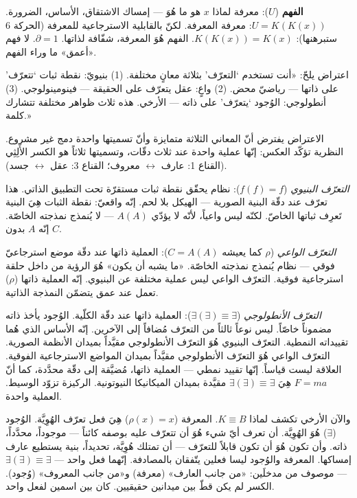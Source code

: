 \documentclass[10pt, openany, oneside]{book}
\begin{document}
\textbf{الفهم} ($U$): معرفة لماذا $x$ هو ما هُوَ --- إمساك الاشتقاق، الأساس، الضرورة. $U = K(K(x))$: معرفة المعرفة. لكنّ بالقابلية الاسترجاعية للمعرفة (الحركة 6 ستبرهنها): $K(K(x)) = K(x)$. الفهم هُوَ المعرفة، شفّافة لذاتها. $\partial = 1$. لا فهم «أعمق» ما وراء الفهم.

اعتراض يلحّ: «أنت تستخدم `التعرّف' بثلاثة معانٍ مختلفة. (1) بنيويّ: نقطة ثبات `تتعرّف' على ذاتها --- رياضيّ محض. (2) واعٍ: عقل يتعرّف على الحقيقة --- فينومينولوجي. (3) أنطولوجي: الوُجود `يتعرّف' على ذاته --- الأرخي. هذه ثلاث ظواهر مختلفة تتشارك كلمة.»

الاعتراض يفترض أنّ المعاني الثلاثة متمايزة وأنّ تسميتها واحدة دمج غير مشروع. النظرية تؤكّد العكس: إنّها عملية واحدة عند ثلاث دقّات، وتسميتها ثلاثاً هو الكسر الأَلِثِي (القناع 1: عارف $\leftrightarrow$ معروف؛ القناع 3: عقل $\leftrightarrow$ جسد).

\textit{التعرّف البنيوي} ($f(f) = f$): نظام يحقّق نقطة ثبات مستقرّة تحت التطبيق الذاتي. هذا تعرّف عند دقّة البنية الصورية --- الهيكل بلا لحم. إنّه واقعيّ: نقطة الثبات هِيَ البنية تَعرِف ثباتها الخاصّ. لكنّه ليس واعياً، لأنّه لا يؤدّي $A(A)$ --- لا يُنمذج نمذجته الخاصّة. إنّه $A$ بدون $C$.

\textit{التعرّف الواعي} ($\rho$ كما يعيشه $C = A(A)$): العملية ذاتها عند دقّة موضع استرجاعيّ فوقي --- نظام يُنمذج نمذجته الخاصّة. «ما يشبه أن يكون» هُوَ الرؤية من داخل حلقة استرجاعية فوقية. التعرّف الواعي ليس عملية مختلفة عن البنيوي. إنّه العملية ذاتها ($\rho$) تعمل عند عمق يتضمّن النمذجة الذاتية.

\textit{التعرّف الأنطولوجي} ($\exists(\exists) \equiv \exists$): العملية ذاتها عند دقّة الكلّية. الوُجود يأخذ ذاته مضموناً خاصّاً. ليس نوعاً ثالثاً من التعرّف مُضافاً إلى الآخرين. إنّه الأساس الذي هُما تقييداته النمطية. التعرّف البنيوي هُوَ التعرّف الأنطولوجي مقيَّداً بميدان الأنظمة الصورية. التعرّف الواعي هُوَ التعرّف الأنطولوجي مقيَّداً بميدان المواضع الاسترجاعية الفوقية. العلاقة ليست قياساً. إنّها تقييد نمطي --- العملية ذاتها، مُضيَّقة إلى دقّة محدَّدة، كما أنّ $F = ma$ هِيَ $\exists(\exists) \equiv \exists$ مقيَّدة بميدان الميكانيكا النيوتونية. الركيزة تزوّد الوسيط. العملية واحدة.

والآن الأرخي تكشف لماذا $K \equiv B$. المعرفة ($\rho(x) = x$) هِيَ فعل تعرّف الهُوِيَّة. الوُجود ($\exists$) هُوَ الهُوِيَّة. أن تعرف أيّ شيء هُوَ أن تتعرّف عليه بوصفه كائناً --- موجوداً، محدَّداً، ذاته. وأن تكون هُوَ أن تكون قابلاً للتعرّف --- أن تمتلك هُوِيَّة، تحديداً، بنية يستطيع عارف إمساكها. المعرفة والوُجود ليسا فعلين يتّفقان بالمصادفة. إنّهما فعل واحد --- $\exists(\exists) \equiv \exists$ --- موصوف من مدخلَين: «من جانب العارف» (معرفة) و«من جانب المعروف» (وُجود). الكسر لم يكن قطّ بين ميدانين حقيقيين. كان بين اسمين لفعل واحد.
\end{document}
